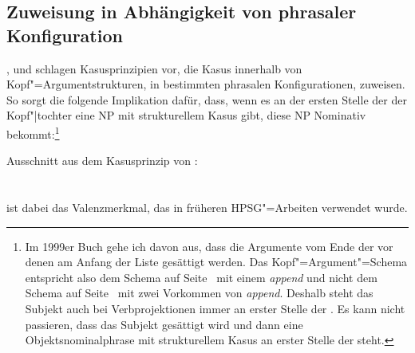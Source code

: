 \subsection{Zuweisung in Abhängigkeit von phrasaler Konfiguration}

\mbox{},  und 
schlagen Kasusprinzipien vor, die Kasus innerhalb von Kopf"=Argumentstrukturen, \dash in bestimmten
phrasalen Konfigurationen, zuweisen. So sorgt \zb die folgende Implikation dafür,
dass, wenn es an der ersten Stelle der \subcatl der Kopf"|tochter eine NP mit strukturellem
Kasus gibt, diese NP Nominativ bekommt:\footnote{
  Im 1999er Buch gehe ich davon aus, dass die Argumente vom Ende der \subcatl vor denen am Anfang der
  Liste gesättigt werden. Das Kopf"=Argument"=Schema entspricht also dem Schema auf
  Seite~\pageref{schema-bin-prel} mit einem \emph{append} und nicht dem Schema auf
  Seite~\pageref{schema-Kopf-Komplementschema-prel2} mit zwei Vorkommen von \emph{append}. Deshalb steht das Subjekt auch bei
  Verbprojektionen immer an erster Stelle der \subcatl. Es kann nicht passieren, dass das Subjekt
  gesättigt wird und dann eine Objektsnominalphrase mit strukturellem Kasus an erster Stelle der \subcatl steht.%
}

\eas
{}%
Ausschnitt aus dem Kasusprinzip von :\\
 ~\impl \\\\
\hfill{}
\zs
\subcat ist dabei das Valenzmerkmal, das in früheren HPSG"=Arbeiten verwendet wurde.

